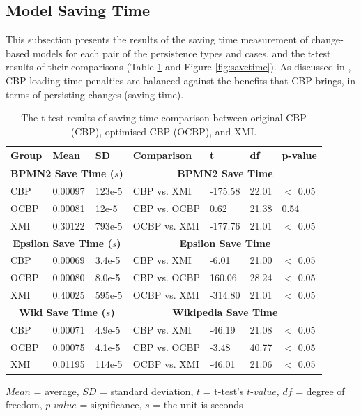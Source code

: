 {\subsection{Model Saving Time}
\label{subsec:saving_time_test}
This subsection presents the results of the saving time measurement of change-based models for each pair of the persistence types and cases, and the t-test results of their comparisons (Table \ref{table:ttest_results_savetime} and Figure \ref{fig:savetime}). As discussed in \cite{DBLP:conf/models/YohannisKP17}, CBP loading time penalties are balanced against the benefits that CBP brings, in terms of  persisting changes (saving time).

\begin{table}[ht]
\footnotesize
\centering
\caption{The t-test results of saving time comparison between original CBP (CBP), optimised CBP (OCBP), and XMI.}
\label{table:ttest_results_savetime}
\begin{tabular}
{|p{}p{}p{}|p{}p{}p{}p{}|}
\hline 

Group & Mean & SD & Comparison & t  & df & p-value \\
\hline 
\multicolumn{3}{|c|}{\textbf{BPMN2 Save Time ($s$)}} & \multicolumn{4}{c|}{\textbf{BPMN2 Save Time}}\\
CBP & 0.00097    & 123e-5 & CBP vs. XMI &  -175.58    & 22.01 & $<$ 0.05 \\  
OCBP & 0.00081   & 12e-5 & CBP vs. OCBP & 0.62 & 21.38  & 0.54 \\  
XMI & 0.30122   & 793e-5 & OCBP vs. XMI & -177.76    & 21.01  & $<$ 0.05 \\ 
\hline 

\multicolumn{3}{|c|}{\textbf{Epsilon Save Time ($s$)}} & \multicolumn{4}{c|}{\textbf{Epsilon Save Time}}\\
CBP & 0.00069    & 3.4e-5 &  CBP vs. XMI & -6.01   &21.00 & $<$ 0.05 \\
OCBP & 0.00080   & 8.0e-5 & CBP vs. OCBP & 160.06 & 28.24 & $<$ 0.05 \\  
XMI & 0.40025   & 595e-5 & OCBP vs. XMI & -314.80  & 21.01  & $<$ 0.05 \\ 
\hline 

\multicolumn{3}{|c|}{\textbf{Wiki Save Time ($s$)}} & \multicolumn{4}{c|}{\textbf{Wikipedia Save Time}}\\
CBP & 0.00071     & 4.9e-5 & CBP vs. XMI &  -46.19   & 21.08 & $<$ 0.05 \\ 
OCBP &0.00075   &  4.1e-5 & CBP vs. OCBP &   -3.48 & 40.77 & $<$ 0.05 \\ 
XMI &  0.01195   & 114e-5 & OCBP vs. XMI &  -46.01  & 21.06 & $<$ 0.05 \\ 
\hline
\end{tabular}
\justify
$Mean$ = average, $SD$ = standard deviation, $t$ = t-test's $t$-$value$, $df$ = degree of freedom, $p$-$value$ = significance, $s$ = the unit is seconds
\end{table}



}
